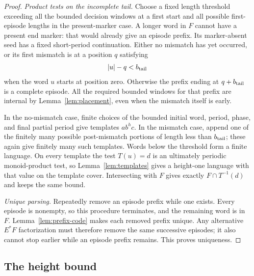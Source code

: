 \begin{proof}
\emph{Product tests on the incomplete tail.}
Choose a fixed length threshold exceeding all the bounded decision
windows at a first start and all possible first-episode lengths in the
present-marker case.  A longer word in $F$ cannot have a present end
marker: that would already give an episode prefix.  Its marker-absent
seed has a fixed short-period continuation.  Either no mismatch has yet
occurred, or its first mismatch is at a position $q$ satisfying
\[
 |u|-q<b_{\rm tail}
\]
when the word $u$ starts at position zero.  Otherwise the prefix ending
at $q+b_{\rm tail}$ is a complete episode.  All the required bounded
windows for that prefix are internal by Lemma~\ref{lem:placement},
even when the mismatch itself is early.

In the no-mismatch case, finite choices of the bounded initial word,
period, phase, and final partial period give templates $a b^h c$.
In the mismatch case, append one of the finitely many possible
post-mismatch portions of length less than $b_{\rm tail}$; these again
give finitely many such templates.  Words below the threshold form a
finite language.  On every template the test $T(u)=d$ is an ultimately
periodic monoid-product test, so Lemma~\ref{lem:templates} gives a
height-one language with that value on the template cover.  Intersecting
with $F$ gives exactly $F\cap T^{-1}(d)$ and keeps the same bound.

\emph{Unique parsing.}
Repeatedly remove an episode prefix while one exists.  Every episode is
nonempty, so this procedure terminates, and the remaining word is in
$F$.  Lemma~\ref{lem:prefix-code} makes each removed prefix unique.
Any alternative $E^*F$ factorization must therefore remove the same
successive episodes; it also cannot stop earlier while an episode
prefix remains.  This proves uniqueness.
\end{proof}

\subsection{The height bound}

